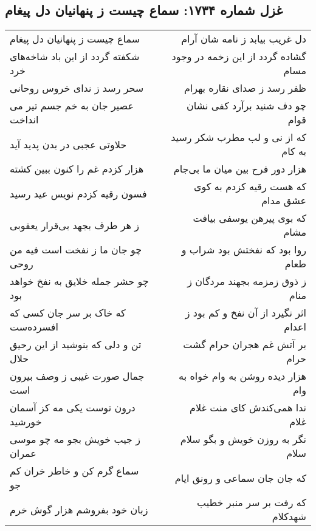 \begin{center}
\section*{غزل شماره ۱۷۳۴: سماع چیست ز پنهانیان دل پیغام}
\label{sec:1734}
\begin{longtable}{l p{0.5cm} r}
سماع چیست ز پنهانیان دل پیغام
&&
دل غریب بیابد ز نامه شان آرام
\\
شکفته گردد از این باد شاخه‌های خرد
&&
گشاده گردد از این زخمه در وجود مسام
\\
سحر رسد ز ندای خروس روحانی
&&
ظفر رسد ز صدای نقاره بهرام
\\
عصیر جان به خم جسم تیر می انداخت
&&
چو دف شنید برآرد کفی نشان قوام
\\
حلاوتی عجبی در بدن پدید آید
&&
که از نی و لب مطرب شکر رسید به کام
\\
هزار کزدم غم را کنون ببین کشته
&&
هزار دور فرح بین میان ما بی‌جام
\\
فسون رقیه کزدم نویس عید رسید
&&
که هست رقیه کزدم به کوی عشق مدام
\\
ز هر طرف بجهد بی‌قرار یعقوبی
&&
که بوی پیرهن یوسفی بیافت مشام
\\
چو جان ما ز نفخت است فیه من روحی
&&
روا بود که نفختش بود شراب و طعام
\\
چو حشر جمله خلایق به نفخ خواهد بود
&&
ز ذوق زمزمه بجهند مردگان ز منام
\\
که خاک بر سر جان کسی که افسرده‌ست
&&
اثر نگیرد از آن نفخ و کم بود ز اعدام
\\
تن و دلی که بنوشید از این رحیق حلال
&&
بر آتش غم هجران حرام گشت حرام
\\
جمال صورت غیبی ز وصف بیرون است
&&
هزار دیده روشن به وام خواه به وام
\\
درون توست یکی مه کز آسمان خورشید
&&
ندا همی‌کندش کای منت غلام غلام
\\
ز جیب خویش بجو مه چو موسی عمران
&&
نگر به روزن خویش و بگو سلام سلام
\\
سماع گرم کن و خاطر خران کم جو
&&
که جان جان سماعی و رونق ایام
\\
زبان خود بفروشم هزار گوش خرم
&&
که رفت بر سر منبر خطیب شهدکلام
\\
\end{longtable}
\end{center}

